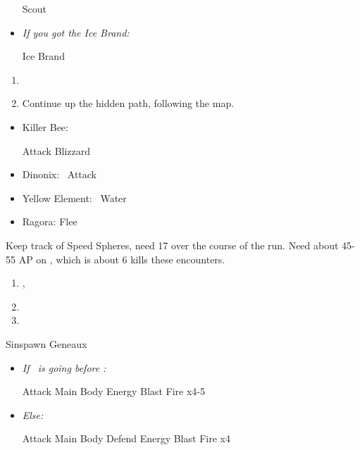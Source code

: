 \begin{equip}
  \begin{itemize}
    \wakkaf Scout
    \item \textit{If you got the Ice Brand:}
          \begin{itemize}
            \tidusf Ice Brand
          \end{itemize}
  \end{itemize}
\end{equip}
\begin{enumerate}[resume]
  \item \formation{\tidus}{\yuna}{\wakka}
  \item Continue up the hidden path, following the map.
\end{enumerate}
\begin{encounters}
  \begin{itemize}
    \item Killer Bee:
          \begin{itemize}
            \wakkaf Attack
            \luluf Blizzard
          \end{itemize}
    \item Dinonix: \tidus\ Attack
    \item Yellow Element: \lulu\ Water
    \item Ragora: Flee
  \end{itemize}
  Keep track of Speed Spheres, need 17 over the course of the run. Need about 45-55 AP on \tidus, which is about 6 kills these encounters.
\end{encounters}
\begin{enumerate}[resume]
  \item\save,  \sd
  \item \formation{\tidus}{\yuna}{\wakka}
  \item \save
\end{enumerate}
\begin{battle}[3000]{Sinspawn Geneaux}
  \begin{itemize}
    \item \textit{If \tidus\ is going before \yuna:}
          \begin{itemize}
            \tidusf Attack Main Body
            \summon{\valefor}
            \valeforf Energy Blast \od
            \valeforf Fire x4-5
          \end{itemize}
    \item \textit{Else:}
          \begin{itemize}
            \switch{\yuna}{\kimahri}
            \kimahrif Attack Main Body
            \tidusf Defend
            \summon{\valefor}
            \valeforf Energy Blast \od
            \valeforf Fire x4
          \end{itemize}
  \end{itemize}
\end{battle}
